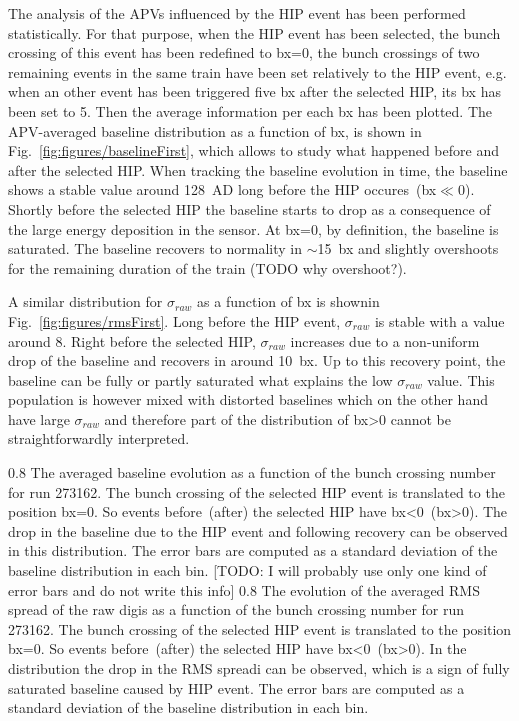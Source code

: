 The analysis of the APVs influenced by the HIP event has been performed statistically. For that purpose, when the HIP event has been selected, the bunch crossing of this event has been redefined to bx=0, the bunch crossings of two remaining events in the same train have been set relatively to the HIP event, e.g. when an other event has been triggered five bx after the selected HIP, its bx has been set to 5. Then the average information per each bx has been plotted. The APV-averaged baseline distribution as a function of bx, is shown in Fig.~\ref{fig:figures/baselineFirst}, which allows to study what happened before and after the selected HIP. When tracking the baseline evolution in time, the baseline shows a stable value around 128~AD long before the HIP occures~(bx$\ll$0). Shortly before the selected HIP the baseline starts to drop as a consequence of the large energy deposition in the sensor. At bx=0, by definition, the baseline is saturated. The baseline recovers to normality in $\sim$15~bx and slightly overshoots for the remaining duration of the train (TODO why overshoot?).

A similar distribution for $\sigma_{raw}$  as a function of bx is shownin Fig.~\ref{fig:figures/rmsFirst}. Long before the HIP event, $\sigma_{raw}$ is stable with a value around 8. Right before the selected HIP, $\sigma_{raw}$ increases due to a non-uniform drop of the baseline and recovers in around 10~bx. Up to this recovery point, the baseline can be fully or partly saturated what explains the low $\sigma_{raw}$ value. This population is however mixed with distorted baselines which on the other hand have large $\sigma_{raw}$ and therefore part of the distribution of bx>0 cannot be straightforwardly interpreted.

                 {0.8}       %
                 {The averaged baseline evolution as a function of the bunch crossing number for run 273162. The bunch crossing of the selected HIP event is translated to the position bx=0. So events before~(after) the selected HIP have bx<0~(bx>0). The drop in the baseline due to the HIP event and following recovery can be observed in this distribution. The error bars are computed as a standard deviation of the baseline distribution in each bin. [TODO: I will probably use only one kind of error bars and do not write this info]  } %
                 {0.8}       %
                 {The evolution of the averaged RMS spread of the raw digis as a function of the bunch crossing number for run 273162. The bunch crossing of the selected HIP event is translated to the position bx=0. So events before~(after) the selected HIP have bx<0~(bx>0). In the distribution the drop in the RMS spreadi can be observed, which is a sign of fully saturated baseline caused by HIP event. The error bars are computed as a standard deviation of the baseline distribution in each bin.  } %

